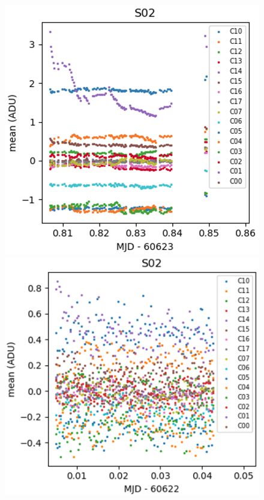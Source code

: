 \begin{figure}[htbp]
\begin{minipage}[b]{0.45\textwidth}
    \centering
    \includegraphics[width=\textwidth]{figures/E2330_R33_S02.png}
\end{minipage}
\hspace{0.05\textwidth}
\hfill
\begin{minipage}[b]{0.45\textwidth}
    \centering
    \includegraphics[width=\textwidth]{figures/E2236_2D_R33_S02.png}

\end{minipage}
\end{figure}
